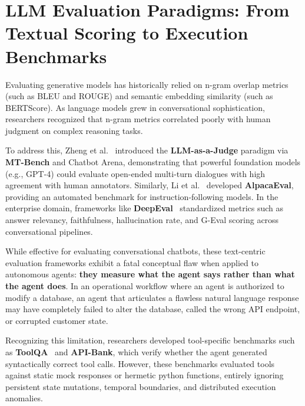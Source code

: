 \section{LLM Evaluation Paradigms: From Textual Scoring to Execution Benchmarks}
\label{sec:lit_eval}
Evaluating generative models has historically relied on n-gram overlap metrics (such as BLEU and ROUGE) and semantic embedding similarity (such as BERTScore). As language models grew in conversational sophistication, researchers recognized that n-gram metrics correlated poorly with human judgment on complex reasoning tasks.

To address this, Zheng et al.~\cite{zheng2023judging} introduced the \textbf{LLM-as-a-Judge} paradigm via \textbf{MT-Bench} and Chatbot Arena, demonstrating that powerful foundation models (e.g., GPT-4) could evaluate open-ended multi-turn dialogues with high agreement with human annotators. Similarly, Li et al.~\cite{li2023alpacaeval} developed \textbf{AlpacaEval}, providing an automated benchmark for instruction-following models. In the enterprise domain, frameworks like \textbf{DeepEval}~\cite{deval2024deepeval} standardized metrics such as answer relevancy, faithfulness, hallucination rate, and G-Eval scoring across conversational pipelines.

While effective for evaluating conversational chatbots, these text-centric evaluation frameworks exhibit a fatal conceptual flaw when applied to autonomous agents: \textbf{they measure what the agent says rather than what the agent does}. In an operational workflow where an agent is authorized to modify a database, an agent that articulates a flawless natural language response may have completely failed to alter the database, called the wrong API endpoint, or corrupted customer state. 

Recognizing this limitation, researchers developed tool-specific benchmarks such as \textbf{ToolQA}~\cite{zhuang2023toolqa} and \textbf{API-Bank}, which verify whether the agent generated syntactically correct tool calls. However, these benchmarks evaluated tools against static mock responses or hermetic python functions, entirely ignoring persistent state mutations, temporal boundaries, and distributed execution anomalies.

